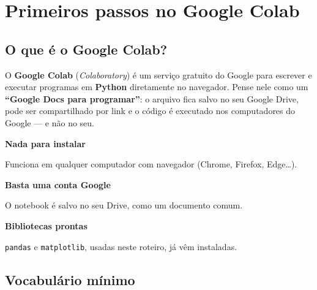 \documentclass[11pt,a4paper]{article}
\begin{document}
\section{Primeiros passos no Google Colab}\label{sec:colab}

\subsection{O que é o Google Colab?}

O \textbf{Google Colab} (\textit{Colaboratory}) é um serviço gratuito do Google para escrever e executar programas em \textbf{Python} diretamente no navegador. Pense nele como um \textbf{``Google Docs para programar''}: o arquivo fica salvo no seu Google Drive, pode ser compartilhado por link e o código é executado nos computadores do Google --- e não no seu.

\begin{tcbraster}[raster columns=3, raster equal height, raster column skip=8pt]
\begin{tcolorbox}[cartao]
{\color{verdeVivo}\Large\faLaptop}\par\vspace{2pt}
\textbf{Nada para instalar}\par
{\color{suave}Funciona em qualquer computador com navegador (Chrome, Firefox, Edge\ldots).}
\end{tcolorbox}
\begin{tcolorbox}[cartao]
{\color{verdeVivo}\Large\faGoogleDrive}\par\vspace{2pt}
\textbf{Basta uma conta Google}\par
{\color{suave}O notebook é salvo no seu Drive, como um documento comum.}
\end{tcolorbox}
\begin{tcolorbox}[cartao]
{\color{verdeVivo}\Large\faBoxOpen}\par\vspace{2pt}
\textbf{Bibliotecas prontas}\par
{\color{suave}\texttt{pandas} e \texttt{matplotlib}, usadas neste roteiro, já vêm instaladas.}
\end{tcolorbox}
\end{tcbraster}

\subsection{Vocabulário mínimo}
\end{document}

